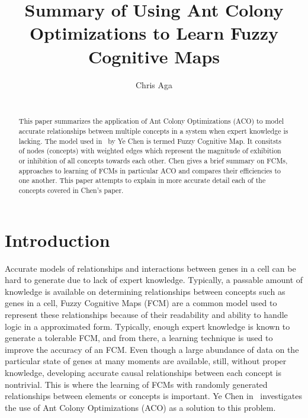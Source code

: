 \documentclass{umm-senior-sem}
\begin{document}
\title{Summary of Using Ant Colony Optimizations to Learn Fuzzy Cognitive Maps}
\author{
\alignauthor
Chris Aga \\
 \\
}

\maketitle

\begin{abstract}
This paper summarizes the application of Ant Colony Optimizations (ACO) to model accurate relationships between multiple concepts in a system when expert knowledge is lacking. The model used in~\cite{main:2012} by Ye Chen is termed Fuzzy Cognitive Map. It consitsts of nodes (concepts) with weighted edges which represent the magnitude of exhibition or inhibition of all concepts towards each other. Chen gives a brief summary on FCMs, approaches to learning of FCMs in particular ACO and compares their efficiencies to one another. This paper attempts to explain in more accurate detail each of the concepts covered in Chen's paper.
\end{abstract}


\section{Introduction}
\label{sec:intro}
Accurate models of relationships and interactions between genes in a cell can be hard to generate due to lack of expert knowledge. Typically, a passable amount of knowledge is available on determining relationships between concepts such as genes in a cell, Fuzzy Cognitive Maps (FCM) are a common model used to represent these relationships because of their readability and ability to handle logic in a approximated form. Typically, enough expert knowledge is known to generate a tolerable FCM, and from there, a learning technique is used to improve the accuracy of an FCM. Even though a large abundance of data on the particular state of genes at many moments are available, still, without proper knowledge, developing accurate causal relationships between each concept is nontrivial. This is where the learning of FCMs with randomly generated relationships between elements or concepts is important. Ye Chen in~\cite{main:2012} investigates the use of Ant Colony Optimizations (ACO) as a solution to this problem. 
\end{document}
